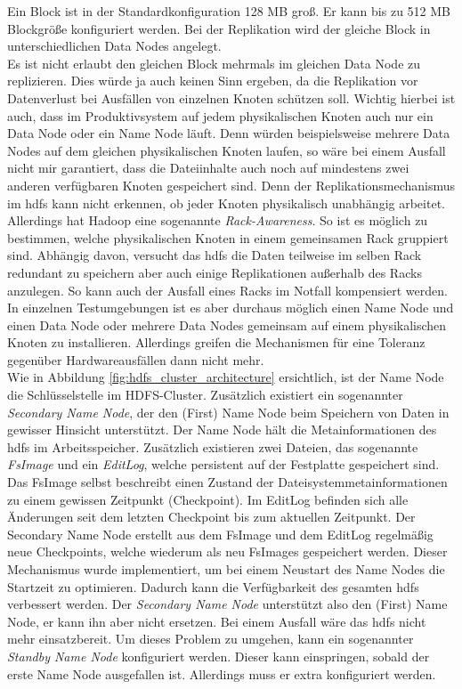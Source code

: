 \noindent
Ein Block ist in der Standardkonfiguration 128 MB groß. Er kann bis zu 512 MB Blockgröße konfiguriert werden. Bei der Replikation wird der gleiche Block in unterschiedlichen Data Nodes angelegt.\\
Es ist nicht erlaubt den gleichen Block mehrmals im gleichen Data Node zu replizieren. Dies würde ja auch keinen Sinn ergeben, da die Replikation vor Datenverlust bei Ausfällen von einzelnen Knoten schützen soll. Wichtig hierbei ist auch, dass im Produktivsystem auf jedem physikalischen Knoten auch nur ein Data Node oder ein Name Node läuft. Denn würden beispielsweise mehrere Data Nodes auf dem gleichen physikalischen Knoten laufen, so wäre bei einem Ausfall nicht mir garantiert, dass die Dateiinhalte auch noch auf mindestens zwei anderen verfügbaren Knoten gespeichert sind. Denn der Replikationsmechanismus im \gls{hdfs} kann nicht erkennen, ob jeder Knoten physikalisch unabhängig arbeitet. Allerdings hat Hadoop eine sogenannte \textit{Rack-Awareness}. So ist es möglich zu bestimmen, welche physikalischen Knoten in einem gemeinsamen Rack gruppiert sind. Abhängig davon, versucht das \gls{hdfs} die Daten teilweise im selben Rack redundant zu speichern aber auch einige Replikationen außerhalb des Racks anzulegen. So kann auch der Ausfall eines Racks im Notfall kompensiert werden.\\
In einzelnen Testumgebungen ist es aber durchaus möglich einen Name Node und einen Data Node oder mehrere Data Nodes gemeinsam auf einem physikalischen Knoten zu installieren. Allerdings greifen die Mechanismen für eine Toleranz gegenüber Hardwareausfällen dann nicht mehr.\\

\noindent
Wie in Abbildung \ref{fig:hdfs_cluster_architecture} ersichtlich, ist der Name Node die Schlüsselstelle im HDFS-Cluster. Zusätzlich existiert ein sogenannter \textit{Secondary Name Node}, der den (First) Name Node beim Speichern von Daten in gewisser Hinsicht unterstützt. Der Name Node hält die Metainformationen des \gls{hdfs} im Arbeitsspeicher. Zusätzlich existieren zwei Dateien, das sogenannte \textit{FsImage} und ein \textit{EditLog}, welche persistent auf der Festplatte gespeichert sind. Das FsImage selbst beschreibt einen Zustand der Dateisystemmetainformationen zu einem gewissen Zeitpunkt (Checkpoint). Im EditLog befinden sich alle Änderungen seit dem letzten Checkpoint bis zum aktuellen Zeitpunkt. Der Secondary Name Node erstellt aus dem FsImage und dem EditLog regelmäßig neue Checkpoints, welche wiederum als neu FsImages gespeichert werden.
Dieser Mechanismus wurde implementiert, um bei einem Neustart des Name Nodes die Startzeit zu optimieren. Dadurch kann die Verfügbarkeit des gesamten \gls{hdfs}  verbessert werden. Der \textit{Secondary Name Node} unterstützt also den (First) Name Node, er kann ihn aber nicht ersetzen. Bei einem Ausfall wäre das \gls{hdfs} nicht mehr einsatzbereit. Um dieses Problem zu umgehen, kann ein sogenannter \textit{Standby Name Node} konfiguriert werden. Dieser kann einspringen, sobald der erste Name Node ausgefallen ist. Allerdings muss er extra konfiguriert werden.\cite[S. 40 ff.]{expert_hadoop_admin}\\

